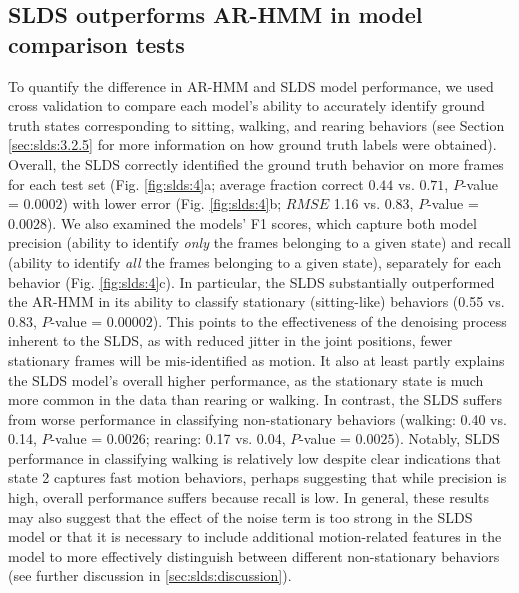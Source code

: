 \subsection{SLDS outperforms AR-HMM in model comparison tests}
\label{sec:slds:3.2.4}

To quantify the difference in AR-HMM and SLDS model performance, we used cross validation to compare each model's ability to accurately identify ground truth states corresponding to sitting, walking, and rearing behaviors (see Section \ref{sec:slds:3.2.5} for more information on how ground truth labels were obtained). Overall, the SLDS correctly identified the ground truth behavior on more frames for each test set (Fig. \ref{fig:slds:4}a; average fraction correct $0.44$ vs. $0.71$, $P$-value = $0.0002$) with lower error (Fig. \ref{fig:slds:4}b; $RMSE$ 1.16 vs. 0.83, $P$-value = $0.0028$). We also examined the models' F1 scores, which capture both model precision (ability to identify \textit{only} the frames belonging to a given state) and recall (ability to identify \textit{all} the frames belonging to a given state), separately for each behavior (Fig. \ref{fig:slds:4}c). In particular, the SLDS substantially outperformed the AR-HMM in its ability to classify stationary (sitting-like) behaviors (0.55 vs. 0.83, $P$-value = $0.00002$). This points to the effectiveness of the denoising process inherent to the SLDS, as with reduced jitter in the joint positions, fewer stationary frames will be mis-identified as motion. It also at least partly explains the SLDS model's overall higher performance, as the stationary state is much more common in the data than rearing or walking. In contrast, the SLDS suffers from worse performance in classifying non-stationary behaviors (walking: 0.40 vs. 0.14, $P$-value = $0.0026$; rearing: 0.17 vs. 0.04, $P$-value = $0.0025$). Notably, SLDS performance in classifying walking is relatively low despite clear indications that state 2 captures fast motion behaviors, perhaps suggesting that while precision is high, overall performance suffers because recall is low. In general, these results may also suggest that the effect of the noise term is too strong in the SLDS model or that it is necessary to include additional motion-related features in the model to more effectively distinguish between different non-stationary behaviors (see further discussion in \ref{sec:slds:discussion}). 

